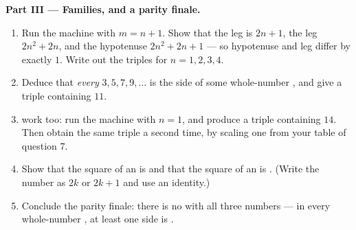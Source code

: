 \begin{problem}[{Weekend problem --- whole-number right triangles,
and the identity $(m^2 - n^2)^2 + (2mn)^2 = (m^2 + n^2)^2$ that
generates them all}]
\medskip
\noindent\textbf{Part III --- Families, and a parity finale.}
\begin{enumerate}[resume]
  \item Run the machine with $m = n + 1$. Show that the  leg is
        $2n + 1$, the  leg $2n^2 + 2n$, and the hypotenuse
        $2n^2 + 2n + 1$ --- so hypotenuse and  leg differ by
        exactly $1$. Write out the triples for $n = 1, 2, 3, 4$.
  \item Deduce that \emph{every}  $3, 5, 7, 9, \dots$
        is the side of some whole-number , and give
        a triple containing $11$.
  \item {} work too: run the machine with $n = 1$, and
        produce a triple containing $14$. Then obtain the same
        triple a second time, by scaling one from your table of
        question 7.
  \item Show that the square of an  is  and that
        the square of an  is . (Write the number as
        $2k$ or $2k + 1$ and use an identity.)
  \item Conclude the parity finale: there is no 
        with all three numbers  --- in every whole-number , at least one side is .
\end{enumerate}
\end{problem}
